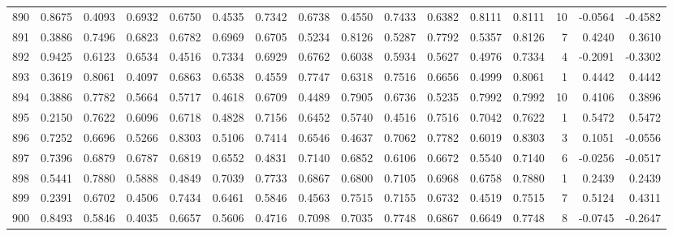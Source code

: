 \begin{tabular}{lrrrrrrrrrrrrrrr}
890 &      0.8675 &  0.4093 &  0.6932 &  0.6750 &  0.4535 &  0.7342 &  0.6738 &  0.4550 &  0.7433 &  0.6382 &   0.8111 &     0.8111 &     10 &                   -0.0564 &                    -0.4582 \\
891 &      0.3886 &  0.7496 &  0.6823 &  0.6782 &  0.6969 &  0.6705 &  0.5234 &  0.8126 &  0.5287 &  0.7792 &   0.5357 &     0.8126 &      7 &                    0.4240 &                     0.3610 \\
892 &      0.9425 &  0.6123 &  0.6534 &  0.4516 &  0.7334 &  0.6929 &  0.6762 &  0.6038 &  0.5934 &  0.5627 &   0.4976 &     0.7334 &      4 &                   -0.2091 &                    -0.3302 \\
893 &      0.3619 &  0.8061 &  0.4097 &  0.6863 &  0.6538 &  0.4559 &  0.7747 &  0.6318 &  0.7516 &  0.6656 &   0.4999 &     0.8061 &      1 &                    0.4442 &                     0.4442 \\
894 &      0.3886 &  0.7782 &  0.5664 &  0.5717 &  0.4618 &  0.6709 &  0.4489 &  0.7905 &  0.6736 &  0.5235 &   0.7992 &     0.7992 &     10 &                    0.4106 &                     0.3896 \\
895 &      0.2150 &  0.7622 &  0.6096 &  0.6718 &  0.4828 &  0.7156 &  0.6452 &  0.5740 &  0.4516 &  0.7516 &   0.7042 &     0.7622 &      1 &                    0.5472 &                     0.5472 \\
896 &      0.7252 &  0.6696 &  0.5266 &  0.8303 &  0.5106 &  0.7414 &  0.6546 &  0.4637 &  0.7062 &  0.7782 &   0.6019 &     0.8303 &      3 &                    0.1051 &                    -0.0556 \\
897 &      0.7396 &  0.6879 &  0.6787 &  0.6819 &  0.6552 &  0.4831 &  0.7140 &  0.6852 &  0.6106 &  0.6672 &   0.5540 &     0.7140 &      6 &                   -0.0256 &                    -0.0517 \\
898 &      0.5441 &  0.7880 &  0.5888 &  0.4849 &  0.7039 &  0.7733 &  0.6867 &  0.6800 &  0.7105 &  0.6968 &   0.6758 &     0.7880 &      1 &                    0.2439 &                     0.2439 \\
899 &      0.2391 &  0.6702 &  0.4506 &  0.7434 &  0.6461 &  0.5846 &  0.4563 &  0.7515 &  0.7155 &  0.6732 &   0.4519 &     0.7515 &      7 &                    0.5124 &                     0.4311 \\
900 &      0.8493 &  0.5846 &  0.4035 &  0.6657 &  0.5606 &  0.4716 &  0.7098 &  0.7035 &  0.7748 &  0.6867 &   0.6649 &     0.7748 &      8 &                   -0.0745 &                    -0.2647 \\

\end{tabular}
